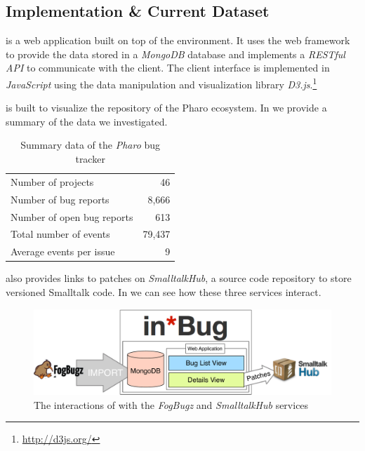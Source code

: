\subsection{Implementation \& Current Dataset}

\ib is a web application built on top of the \pha environment.
It uses the \sea web framework~\cite{Duca2010a} to provide the data stored in a \textit{MongoDB} database and implements a \textit{RESTful API} to communicate with the client.
The client interface is implemented in \textit{JavaScript} using the data manipulation and visualization library \textit{D3.js}.\footnote{\url{http://d3js.org/}}

\ib is built to visualize the \fbz repository of the Pharo ecosystem.
In  we provide a summary of the data we investigated.

\begin{table}[ht]\small
\centering
\caption{Summary data of the \textit{Pharo} bug tracker}
\label{tab:tracker-summary}
\begin{tabular}{p{7cm} r} \hline
Number of projects & 46 \\
Number of bug reports & 8,666 \\
Number of open bug reports & 613 \\
Total number of events & 79,437 \\
Average events per issue & 9 \\ \hline
\end{tabular}
\end{table}

\ib also provides links to patches on \emph{SmalltalkHub}, a source code repository to store versioned Smalltalk code.
In  we can see how these three services interact.

\begin{figure}[t]
\centering
\includegraphics[width=.8\linewidth]{Images/visualize/inbug-ecosystem.pdf}
\caption{The interactions of \ib with the \emph{FogBugz} and \emph{SmalltalkHub} services}
\label{fig:inbug-ecosystem}
\end{figure}

